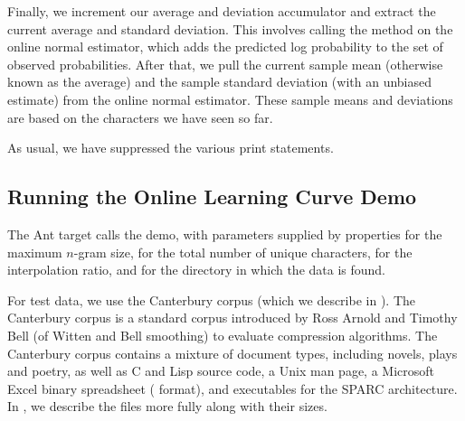 Finally, we increment our average and deviation accumulator and
extract the current average and standard deviation.
%
%
This involves calling the  method on the online
normal estimator, which adds the predicted log probability to the set
of observed probabilities.  After that, we pull the current sample
mean (otherwise known as the average) and the sample standard
deviation (with an unbiased estimate) from the online normal
estimator.  These sample means and deviations are based on the
characters we have seen so far.

As usual, we have suppressed the various print statements.


\subsection{Running the Online Learning Curve Demo}

The Ant target  calls the demo, with
parameters supplied by properties  for the maximum
$n$-gram size,  for the total number of
unique characters,  for the interpolation
ratio, and  for the directory in which the
data is found.

For test data, we use the Canterbury corpus (which we describe in
).  The Canterbury corpus is a standard
corpus introduced by Ross Arnold and Timothy Bell (of Witten and Bell
smoothing) to evaluate compression algorithms.  The Canterbury corpus
contains a mixture of document types, including novels, plays and
poetry, as well as C and Lisp source code, a Unix man page, a
Microsoft Excel binary spreadsheet ( format), and
executables for the SPARC architecture.  In ,
we describe the files more fully along with their sizes.

